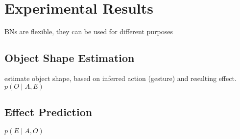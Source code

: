 
\section{Experimental Results}

\acp{BN} are flexible, they can be used for different purposes

\subsection{Object Shape Estimation}

estimate object shape, based on inferred action (gesture) and resulting effect. $p(O \mid A, E)$

\subsection{Effect Prediction}

$p(E \mid A, O)$
